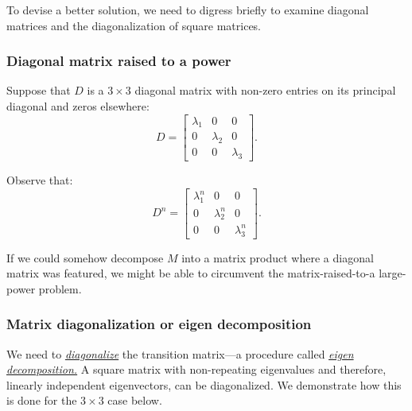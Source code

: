 \documentclass[
  12pt,
  a4paper,
]{article}
\begin{document}
To devise a better solution, we need to digress briefly to examine
diagonal matrices and the diagonalization of square matrices.

\hypertarget{diagonal-matrix-raised-to-a-power}{%
\subsubsection{Diagonal matrix raised to a
power}\label{diagonal-matrix-raised-to-a-power}}

Suppose that \(D\) is a \(3 \times 3\) diagonal matrix with non-zero
entries on its principal diagonal and zeros elsewhere: \[
D = \begin{bmatrix}
\lambda_{1} & 0 & 0\\
0 & \lambda_{2} & 0\\
0 & 0 & \lambda_{3}
\end{bmatrix}.
\]

Observe that: \begin{equation}
D^{n} = \begin{bmatrix}
\lambda_{1}^{n}& 0 & 0\\
0 & \lambda_{2} ^{n}& 0\\
0 & 0 & \lambda_{3}^{n}
\end{bmatrix}.
\label{eq:D-to-the-n}\end{equation}

If we could somehow decompose \(M\) into a matrix product where a
diagonal matrix was featured, we might be able to circumvent the
matrix-raised-to-a large-power problem.

\hypertarget{matrix-diagonalization-or-eigen-decomposition}{%
\subsubsection{Matrix diagonalization or eigen
decomposition}\label{matrix-diagonalization-or-eigen-decomposition}}

We need to
\href{http://mathworld.wolfram.com/MatrixDiagonalization.html}{\emph{diagonalize}}
the transition matrix---a procedure called
\href{http://mathworld.wolfram.com/EigenDecomposition.html}{\emph{eigen
decomposition.}} A square matrix with non-repeating eigenvalues and
therefore, linearly independent eigenvectors, can be diagonalized. We
demonstrate how this is done for the \(3 \times 3\) case below.
\end{document}
